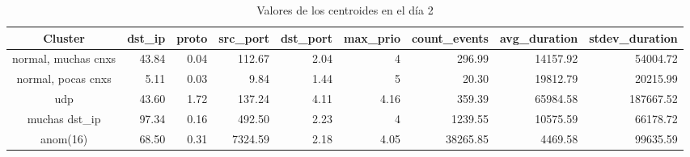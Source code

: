 \begin{table}[h]
    \begingroup
    \setlength{\tabcolsep}{2pt} %
    \hspace*{-3cm}
    \begin{tabular}{|c|r|r|r|r|r|r|r|r|}
    \hline
    \textbf{Cluster}    & \textbf{dst\_ip} & \textbf{proto} & \textbf{src\_port} & \textbf{dst\_port} & \textbf{max\_prio} & \textbf{count\_events} & \textbf{avg\_duration} & \textbf{stdev\_duration} \\ \hline
    normal, muchas cnxs & 43.84            & 0.04           & 112.67             & 2.04               & 4                  & 296.99                 & 14157.92               & 54004.72                 \\ \hline
    normal, pocas cnxs  & 5.11             & 0.03           & 9.84               & 1.44               & 5                  & 20.30                  & 19812.79               & 20215.99                 \\ \hline
    udp                 & 43.60            & 1.72           & 137.24             & 4.11               & 4.16               & 359.39                 & 65984.58               & 187667.52                \\ \hline
    muchas dst\_ip      & 97.34            & 0.16           & 492.50             & 2.23               & 4                  & 1239.55                & 10575.59               & 66178.72                 \\ \hline
    anom(16)            & 68.50            & 0.31           & 7324.59            & 2.18               & 4.05               & 38265.85               & 4469.58                & 99635.59                 \\ \hline
    \end{tabular}
    \endgroup
\caption{Valores de los centroides en el día 2}
\label{tab:dia2}
\end{table}


